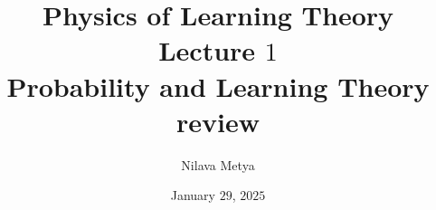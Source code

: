 
\usepackage{wrapfig}
\setlength{\columnsep}{0.7cm}
\usepackage[
backend=biber,
style=alphabetic,%
citestyle=ieee-alphabetic,
maxnames=10,
sorting=ynt
]{biblatex}
%
\title{\textbf{Physics of Learning Theory}\\ Lecture $1$ \\
Probability and Learning Theory review}
\usepackage{quiver}
\usepackage[nobottomtitles*]{titlesec}
\usepackage{titletoc}
\author{Nilava Metya}
\date{\vspace{-0.7in}January $29$, $2025$}
\usepackage{pdfpages}
\usepackage{fancyhdr}
	\pagestyle{fancyplain}
	\fancyhf{}
	\fancyhead[R]{\thepage}
\newcommand{\fa}{~\forall~}
\usepackage{algpseudocode}
\renewcommand{\algorithmicrequire}{\textbf{Input:}}
\renewcommand{\algorithmicensure}{\textbf{Output:}}


\maketitle

